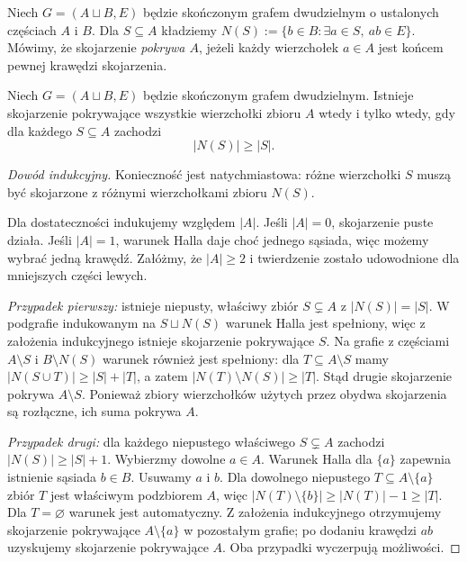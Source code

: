\begin{definicja}
Niech $G=(A\sqcup B,E)$ będzie skończonym grafem
dwudzielnym o ustalonych częściach $A$ i $B$.
Dla $S\subseteq A$ kładziemy
$N(S):=\{b\in B:\exists a\in S,\ ab\in E\}$.
Mówimy, że skojarzenie \emph{pokrywa $A$}, jeżeli
każdy wierzchołek $a\in A$ jest końcem pewnej
krawędzi skojarzenia.
\end{definicja}

\begin{twierdzenie}
\label{thm:tg-hall}
Niech $G=(A\sqcup B,E)$ będzie skończonym grafem
dwudzielnym. Istnieje skojarzenie pokrywające
wszystkie wierzchołki zbioru $A$ wtedy i tylko wtedy,
gdy dla każdego $S\subseteq A$ zachodzi
\[
|N(S)|\ge |S|.
\]
\end{twierdzenie}

\begin{proof}[Dowód indukcyjny]
Konieczność jest natychmiastowa: różne wierzchołki
$S$ muszą być skojarzone z różnymi wierzchołkami
zbioru $N(S)$.

Dla dostateczności indukujemy względem $|A|$.
Jeśli $|A|=0$, skojarzenie puste działa.
Jeśli $|A|=1$, warunek Halla daje choć jednego
sąsiada, więc możemy wybrać jedną krawędź.
Załóżmy, że $|A|\ge2$ i twierdzenie zostało
udowodnione dla mniejszych części lewych.

\emph{Przypadek pierwszy:} istnieje niepusty, właściwy
zbiór $S\subsetneq A$ z $|N(S)|=|S|$.
W podgrafie indukowanym na $S\sqcup N(S)$
warunek Halla jest spełniony, więc z założenia
indukcyjnego istnieje skojarzenie pokrywające $S$.
Na grafie z częściami $A\setminus S$
i $B\setminus N(S)$ warunek również jest spełniony:
dla $T\subseteq A\setminus S$ mamy
$|N(S\cup T)|\ge|S|+|T|$, a zatem
$|N(T)\setminus N(S)|\ge|T|$.
Stąd drugie skojarzenie pokrywa $A\setminus S$.
Ponieważ zbiory wierzchołków użytych przez obydwa
skojarzenia są rozłączne, ich suma pokrywa $A$.

\emph{Przypadek drugi:} dla każdego niepustego
właściwego $S\subsetneq A$ zachodzi
$|N(S)|\ge|S|+1$. Wybierzmy dowolne $a\in A$.
Warunek Halla dla $\{a\}$ zapewnia istnienie
sąsiada $b\in B$. Usuwamy $a$ i $b$.
Dla dowolnego niepustego $T\subseteq A\setminus\{a\}$
zbiór $T$ jest właściwym podzbiorem $A$, więc
$|N(T)\setminus\{b\}|\ge|N(T)|-1\ge|T|$.
Dla $T=\varnothing$ warunek jest automatyczny.
Z założenia indukcyjnego otrzymujemy skojarzenie
pokrywające $A\setminus\{a\}$ w pozostałym grafie;
po dodaniu krawędzi $ab$ uzyskujemy skojarzenie
pokrywające $A$.
Oba przypadki wyczerpują możliwości.
\end{proof}

